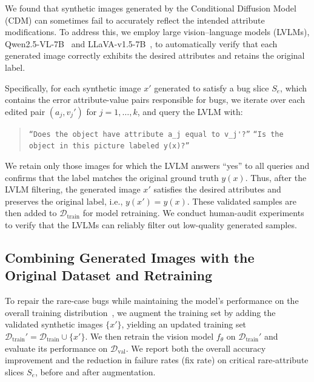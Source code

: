 \documentclass[10pt]{article} %
\newcommand{\qwen}{Qwen2.5-VL\xspace}
\newcommand{\llava}{LLaVA-v1.5\xspace}
\begin{document}
We found that synthetic images generated by the Conditional Diffusion Model (CDM) can sometimes fail to accurately reflect the intended attribute modifications. To address this, we employ large vision--language models (LVLMs), \qwen{}-7B~\citep{bai2025qwen25vl} and \llava{}-7B~\citep{liu2023improvedllava}, to automatically verify that each generated image correctly exhibits the desired attributes and retains the original label.

Specifically, for each synthetic image \(x'\) generated to satisfy a bug slice \(S_e\), which contains the error attribute-value pairs responsible for bugs, we iterate over each edited pair \((a_j, v_j')\) for \(j = 1, \dots, k\), and query the LVLM with: 
\vspace{-3pt}
\begin{quote}
\centering
\setlength{\parskip}{0pt}
\setlength{\parsep}{0pt}
\texttt{``Does the object have attribute \(a_j\) equal to \(v_j'\)?''} \newline
\texttt{``Is the object in this picture labeled \(y(x)\)?''}
\end{quote}
\vspace{-5pt}

We retain only those images for which the LVLM answers “yes” to all queries and confirms that the label matches the original ground truth \(y(x)\). Thus, after the LVLM filtering, the generated image \(x'\) satisfies the desired attributes and preserves the original label, i.e., \(y(x') = y(x)\). These validated samples are then added to \(\mathcal{D}_{\mathrm{train}}\) for model retraining. We conduct human-audit experiments to verify that the LVLMs can reliably filter out low-quality generated samples.



\subsection{Combining Generated Images with the Original Dataset and Retraining}
To repair the rare-case bugs while maintaining the model's performance on the overall training distribution~\citep{lee2024genmix}, we augment the training set by adding the validated synthetic images \(\{x'\}\), yielding an updated training set 
$
\mathcal{D}_{\mathrm{train}}' = \mathcal{D}_{\mathrm{train}} \cup \{x'\}.
$
We then retrain the vision model \(f_\theta\) on \(\mathcal{D}_{\mathrm{train}}'\) and evaluate its performance on \(\mathcal{D}_{\mathrm{val}}\). We report both the overall accuracy improvement and the reduction in failure rates (fix rate) on critical rare‐attribute slices \(S_e\), before and after augmentation.
\end{document}
